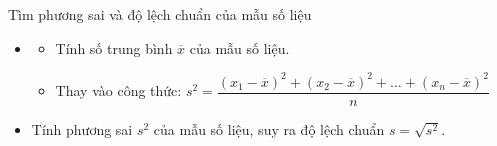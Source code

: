 \begin{dang}{Tìm phương sai và độ lệch chuẩn của mẫu số liệu}
	\begin{itemize}
		\item [\iconMT] 
		\begin{itemize}
			\item [$\bullet$] Tính số trung bình  $\overline{x}$ của mẫu số liệu.
			\item [$\bullet$] Thay vào công thức: $s^{2}=\dfrac{\left(x_{1}-\overline{x}\right)^{2}+\left(x_{2}-\overline{x}\right)^{2}+\ldots+\left(x_{n}-\overline{x}\right)^{2}}{n}$
		\end{itemize}
		\item [\iconMT]  Tính phương sai $s^2$ của mẫu số liệu, suy ra độ lệch chuẩn $s=\sqrt{s^2}$.
	\end{itemize}
\end{dang}

